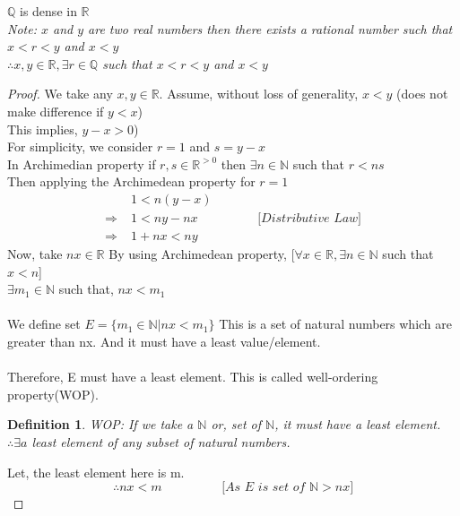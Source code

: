 \documentclass{article}
\newtheorem{definition}{Definition}[section]
\newcommand{\Rw}{\Rightarrow}
\newcommand{\hs}{\hspace}
\begin{document}
\begin{theorem}{}{}
    $\mathbb{Q}$ is dense in $\mathbb{R}$\\
    \textit{Note: $x$ and $y$ are two real numbers then there exists a rational number such that $x<r<y$ and $x<y$\\
    $\therefore x,y \in \mathbb{R}, \exists r \in \mathbb{Q}$ such that $x<r<y$ and $x<y$ }
    \begin{proof}
                We take any $x,y \in \mathbb{R}$. Assume, without loss of generality, $x<y$ (does not make difference if $y<x$)\\
        This implies, $y-x>0$)\\
        For simplicity, we consider $r=1$ and $s=y-x$\\
        In Archimedian property if $r,s \in \mathbb{R}^{>0} $ then $\exists n \in \mathbb{N}$ such that $r<ns$\\
        Then applying the Archimedean property for $r=1$\\
        \begin{align}
            & 1 < n(y-x) \nonumber\\
            \Rw \; & 1 < ny-nx \hs{2cm} \textit{[Distributive Law]}\nonumber\\
            \Rw \; & 1+nx < ny \label{ape1}
        \end{align}
        Now, take $nx \in \mathbb{R}$ By using Archimedean property, 
        [$\forall x \in \mathbb{R}, \exists n \in \mathbb{N}$ such that $x<n$]\\
        $\exists m_1 \in \mathbb{N}$ such that, $nx<m_1$\\\\
        We define set $ E=\{ m_1 \in \mathbb{N} | nx<m_1\} $ This is a set of natural numbers which are greater than nx. And it must have a least value/element.\\\\
        Therefore, E must have a least element. This is called well-ordering property(WOP).
        \begin{definition}{WOP:}
            If we take a $\mathbb{N}$ or, set of $\mathbb{N}$, it must have a least element. $\therefore \exists a$ least element of any subset of natural numbers.
        \end{definition}
        Let, the least element here is m.\\
        \begin{equation}
            \therefore nx < m \hs{2cm} \label{ape2}\textit{[As E is set of $\mathbb{N}>nx$]}

\end{equation}
\end{proof}
\end{theorem}
\end{document}
